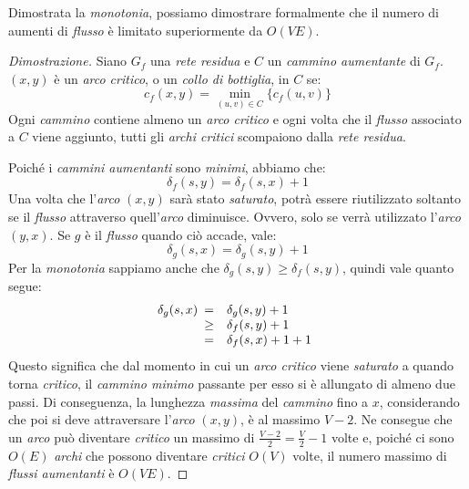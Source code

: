 \noindent
Dimostrata la \emph{monotonia}, possiamo dimostrare formalmente che il numero
di aumenti di \emph{flusso} è limitato superiormente da $O(VE)$.

\begin{proof}[Dimostrazione]
    Siano $G_f$ una \emph{rete residua} e $C$ un \emph{cammino aumentante} di
    $G_f$. $(x,y)$ è un \emph{arco critico}, o un \emph{collo di bottiglia},
    in $C$ se:
    \[c_f(x,y)=\min_{(u,v)\in C}\{c_f(u,v)\}\]
    Ogni \emph{cammino} contiene almeno un \emph{arco critico} e ogni volta che
    il \emph{flusso} associato a $C$ viene aggiunto, tutti gli \emph{archi
    critici} scompaiono dalla \emph{rete residua}.

    \noindent
    Poiché i \emph{cammini aumentanti} sono \emph{minimi}, abbiamo che:
    \[\delta_f(s,y)=\delta_f(s,x)+1\]
    Una volta che l'\emph{arco} $(x,y)$ sarà stato \emph{saturato}, potrà essere
    riutilizzato soltanto se il \emph{flusso} attraverso quell'\emph{arco}
    diminuisce. Ovvero, solo se verrà utilizzato l'\emph{arco} $(y,x)$.
    Se $g$ è il \emph{flusso} quando ciò accade, vale:
    \[\delta_g(s,x)=\delta_g(s,y)+1\]
    Per la \emph{monotonia} sappiamo anche che $\delta_g(s,y)\geq\delta_f(s,y)$,
    quindi vale quanto segue:
    \[\delta_g(s,x)\begin{array}[t]{cl}
        = & \delta_g(s,y)+1\\
        \geq & \delta_f(s,y)+1\\
        = & \delta_f(s,x)+1+1
    \end{array}\]
    Questo significa che dal momento in cui un \emph{arco critico} viene
    \emph{saturato} a quando torna \emph{critico}, il \emph{cammino minimo}
    passante per esso si è allungato di almeno due passi. Di conseguenza, la
    lunghezza \emph{massima} del \emph{cammino} fino a $x$, considerando che
    poi si deve attraversare l'\emph{arco} $(x,y)$, è al massimo $V-2$. Ne
    consegue che un \emph{arco} può diventare \emph{critico} un massimo di
    $\frac{V-2}{2}=\frac{V}{2}-1$ volte e, poiché ci sono $O(E)$ \emph{archi}
    che possono diventare \emph{critici} $O(V)$ volte, il numero massimo di
    \emph{flussi aumentanti} è $O(VE)$.
\end{proof}

